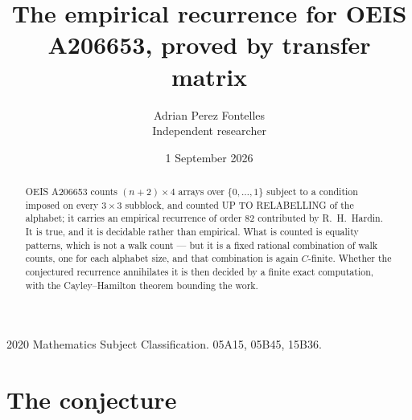 \documentclass[11pt,a4paper]{article}
\title{The empirical recurrence for OEIS A206653, proved by transfer matrix}
\author{Adrian Perez Fontelles\\ \small Independent researcher}
\date{1 September 2026}
\theoremstyle{plain}
\theoremstyle{definition}
\begin{document}
\maketitle

\begin{abstract}
OEIS A206653 counts $(n+2)\times4$ arrays over $\{0,\dots,1\}$ subject to a condition imposed on
every $3\times3$ subblock, and counted UP TO RELABELLING of the
alphabet; it carries an empirical recurrence of order $82$ contributed by
R.~H.~Hardin. It is true, and it is decidable rather than empirical. What is counted is
equality patterns, which is not a walk count --- but it is a fixed rational combination of
walk counts, one for each alphabet size, and that combination is again $C$-finite. Whether the
conjectured recurrence annihilates it is then decided by a finite exact computation, with the
Cayley--Hamilton theorem bounding the work.
\end{abstract}

\noindent\small 2020 Mathematics Subject Classification. 05A15, 05B45, 15B36.\normalsize

\section{The conjecture}
\end{document}
